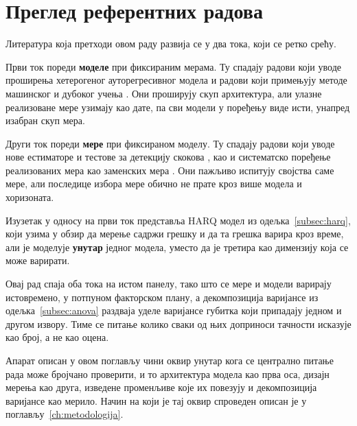 \section{Преглед референтних радова}
\label{sec:odnos}

Литература која претходи овом раду развија се у два тока, који се ретко срећу.

Први ток пореди \textbf{моделе} при фиксираним мерама. Ту спадају радови који уводе
проширења хетерогеног ауторегресивног модела \parencite{corsi2009,abd2007,bpq2016} и
радови који примењују методе машинског и дубоког учења
\parencite{christensen2023,leushuisPetkov2026}. Они проширују скуп архитектура, али
улазне реализоване мере узимају као дате, па сви модели у поређењу виде исти, унапред
изабран скуп мера.

Други ток пореди \textbf{мере} при фиксираном моделу. Ту спадају радови који уводе
нове естиматоре и тестове за детекцију скокова
\parencite{bns2004,andersen2012,corsiPirinoReno2010}, као и систематско поређење
реализованих мера као заменских мера \parencite{lps2015}. Они пажљиво испитују својства саме
мере, али последице избора мере обично не прате кроз више модела и хоризоната.

Изузетак у односу на први ток представља HARQ модел из одељка~\ref{subsec:harq}, који
узима у обзир да мерење садржи грешку и да та грешка варира кроз време, али је моделује
\textbf{унутар} једног модела, уместо да је третира као димензију која се може
варирати.

Овај рад спаја оба тока на истом панелу, тако што се мере и модели варирају истовремено, у
потпуном факторском плану, а декомпозиција варијансе из одељка~\ref{subsec:anova}
раздваја уделе варијансе губитка који припадају једном и другом извору. Тиме се питање
колико сваки од њих доприноси тачности исказује као број, а не као оцена.

Апарат описан у овом поглављу чини оквир унутар кога се централно питање рада може
бројчано проверити, и то архитектура модела као прва оса, дизајн мерења као друга, изведене
променљиве које их повезују и декомпозиција варијансе као мерило. Начин на који
је тај оквир спроведен описан је у поглављу~\ref{ch:metodologija}.

